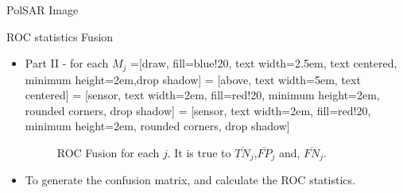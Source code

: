 \documentclass[10pt]{beamer}
\begin{document}
\begin{frame}[fragile]{PolSAR Image}
\begin{alertblock}{ROC statistics Fusion}
\begin{itemize}
\item Part II - for each $M_j$
=[draw, fill=blue!20, text width=2.5em, 
    text centered, minimum height=2em,drop shadow]
 = [above, text width=5em, text centered]
 = [sensor, text width=2em, fill=red!20, 
    minimum height=2em, rounded corners, drop shadow]
 = [sensor, text width=2em, fill=red!20, 
    minimum height=2em, rounded corners, drop shadow]
\begin{figure}[hbt]
\caption{ROC Fusion for each $j$. It is true to $\overline{TN}_j$,$\overline{FP}_j$ and, $\overline{FN}_j$. }
\label{fig9}
\end{figure}
\item To generate the confusion matrix, and calculate the ROC statistics.
\end{itemize}
\end{alertblock}
\end{frame}
\end{document}
